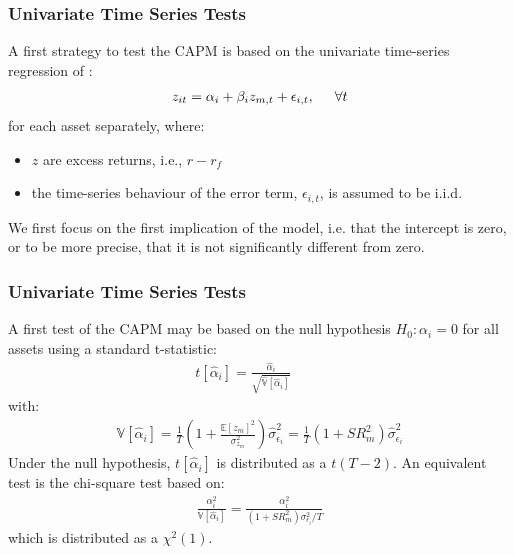 \documentclass[xcolor=dvipsnames, english, 8pt]{beamer}
\begin{document}
\begin{frame}
    \frametitle{Univariate Time Series Tests}
A first strategy to test the CAPM is based on the univariate time-series regression of \cite{Black1972}:
    \begin{align}
    z_{it} = \alpha_i + \beta_iz_{m,t} + \epsilon_{i,t}, \hspace{0.5cm} \forall t \label{unitestreg}
    \end{align}
    for each asset separately, where:\vspace{0.25cm}\\
\begin{itemize}
    \item  $z$ are excess returns, i.e., $r-r_f$
    \item  the time-series behaviour of the error term, $\epsilon_{i,t}$, is assumed to be i.i.d.\vspace{0.25cm}\\
\end{itemize}
We first focus on the first implication of the model, i.e. that the intercept is zero, or to be more precise, that it is not significantly different from zero.
\end{frame}

\begin{frame}
    \frametitle{Univariate Time Series Tests}
    A first test of the CAPM may be based on the null hypothesis $H_0: \alpha_i = 0$ for all assets
    using a standard t-statistic:
    \begin{align}
        t[\hat{\alpha}_i] = \frac{\hat{\alpha}_i}{\sqrt{\hat{\mathbb{V}}[\hat{\alpha}_i]}} \hspace{1cm} 
      \end{align}
      with:      
        \begin{align}    
         \mathbb{V}[\hat{\alpha}_i] = \frac{1}{T}\left(1+\frac{\mathbb{E}[z_m]^2}{\sigma_{z_m}^2} \right)\hat{\sigma}_{\epsilon_i}^2 = \frac{1}{T}\left( 1+SR_m^2\right)\hat{\sigma}_{\epsilon_i}^2
    \end{align}
Under the null hypothesis, $t[\hat{\alpha}_i]$ is distributed as a $t(T-2)$. An equivalent test is the chi-square test based on:
\begin{align}
\frac{\alpha_i^2}{\mathbb{V}[\hat{\alpha}_i]} = \frac{\alpha_i^2}{(1+SR_m^2)\sigma_{\epsilon_i}^2/T} \label{chitest1}
\end{align}
which is distributed as a $\chi^2(1)$.
\end{frame}
\end{document}

